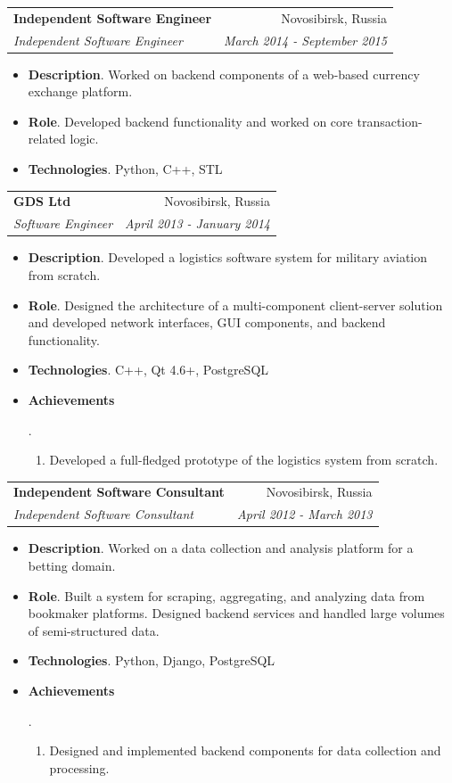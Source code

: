 \documentclass[letterpaper,11pt]{article}
\makeatletter
\newcommand{\resumeItem}[2]{
  \item\small{
    \textbf{#1}{. #2 \vspace{-2pt}}
  }
}
\newcommand{\resumeSubheading}[4]{
  \vspace{-1pt}\item
    \begin{tabular*}{0.97\textwidth}{l@{\extracolsep{\fill}}r}
      \textbf{#1} & #2 \\
      \textit{\small#3} & \textit{\small #4} \\
    \end{tabular*}\vspace{-5pt}
}
\newcommand{\resumeItemListStart}{\begin{itemize}}
\newcommand{\resumeItemListEnd}{\end{itemize}\vspace{-5pt}}
\makeatother
\begin{document}
\resumeSubheading
      {Independent Software Engineer}{Novosibirsk, Russia}
      {Independent Software Engineer}{March 2014 - September 2015}
      \resumeItemListStart
        \resumeItem{Description}
          {Worked on backend components of a web-based currency exchange platform.}
        \resumeItem{Role}
          {Developed backend functionality and worked on core transaction-related logic.}
        \resumeItem{Technologies}
          {Python, C++, STL}
      \resumeItemListEnd

\resumeSubheading
      {GDS Ltd}{Novosibirsk, Russia}
      {Software Engineer}{April 2013 - January 2014}
      \resumeItemListStart
        \resumeItem{Description}
          {Developed a logistics software system for military aviation from scratch.}
        \resumeItem{Role}
          {Designed the architecture of a multi-component client-server solution and developed network interfaces, GUI components, and backend functionality.}
        \resumeItem{Technologies}
          {C++, Qt 4.6+, PostgreSQL}
        \resumeItem{Achievements}
          {
            \begin{enumerate}
              \item Developed a full-fledged prototype of the logistics system from scratch.
            \end{enumerate}
          }
      \resumeItemListEnd

\resumeSubheading
      {Independent Software Consultant}{Novosibirsk, Russia}
      {Independent Software Consultant}{April 2012 - March 2013}
      \resumeItemListStart
        \resumeItem{Description}
          {Worked on a data collection and analysis platform for a betting domain.}
        \resumeItem{Role}
          {Built a system for scraping, aggregating, and analyzing data from bookmaker platforms. Designed backend services and handled large volumes of semi-structured data.}
        \resumeItem{Technologies}
          {Python, Django, PostgreSQL}
        \resumeItem{Achievements}
          {
            \begin{enumerate}
              \item Designed and implemented backend components for data collection and processing.
            \end{enumerate}
          }
      \resumeItemListEnd
\end{document}

